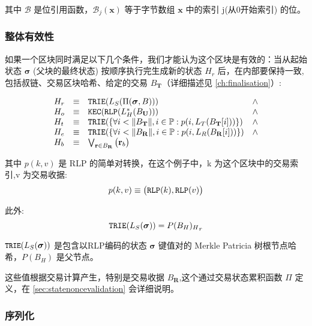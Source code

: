 \documentclass[9pt,oneside]{amsart}
\begin{document}
\begin{multicols}{2}
其中 $\mathcal{B}$ 是位引用函数，$\mathcal{B}_j(\mathbf{x})$ 等于字节数组 $\mathbf{x}$ 中的索引 j(从0开始索引) 的位。

\subsubsection{整体有效性}

如果一个区块同时满足以下几个条件，我们才能认为这个区块是有效的：当从起始状态 $\boldsymbol{\sigma}$ (父块的最终状态) 按顺序执行完生成新的状态 $H_r$ 后，在内部要保持一致,包括叔链、交易区块哈希、给定的交易 $B_\mathbf{T}$（详细描述见 \ref{ch:finalisation}）:

\begin{equation}
\begin{array}[t]{lclc}
H_r &\equiv& \mathtt{\small TRIE}(L_S(\Pi(\boldsymbol{\sigma}, B))) & \wedge \\
H_o &\equiv& \mathtt{\small KEC}(\mathtt{\small RLP}(L_H^*(B_\mathbf{U}))) & \wedge \\
H_t &\equiv& \mathtt{\small TRIE}(\{\forall i < \lVert B_\mathbf{T} \rVert, i \in \mathbb{P}: p(i, L_T(B_\mathbf{T}[i]))\}) & \wedge \\
H_e &\equiv& \mathtt{\small TRIE}(\{\forall i < \lVert B_\mathbf{R} \rVert, i \in \mathbb{P}: p(i, L_R(B_\mathbf{R}[i]))\}) & \wedge \\
H_b &\equiv& \bigvee_{\mathbf{r} \in B_\mathbf{R}} \big( \mathbf{r}_b \big)
\end{array}
\end{equation}

其中 $p(k, v)$ 是 RLP 的简单对转换，在这个例子中，k 为这个区块中的交易索引,v 为交易收据:
\begin{equation}
p(k, v) \equiv \big( \mathtt{\small RLP}(k), \mathtt{\small RLP}(v) \big)
\end{equation}

此外:
\begin{equation}
\mathtt{\small TRIE}(L_S(\boldsymbol{\sigma})) = {P(B_H)_H}_r
\end{equation}

$\texttt{\small TRIE}(L_S(\boldsymbol{\sigma}))$ 是包含以RLP编码的状态 $\boldsymbol{\sigma}$ 键值对的 Merkle Patricia 树根节点哈希，$P(B_H)$ 是父节点。

这些值根据交易计算产生，特别是交易收据 $B_\mathbf{R}$,这个通过交易状态累积函数 $\Pi$ 定义，在 \ref{sec:statenoncevalidation} 会详细说明。

\subsubsection{序列化}


\end{multicols}
\end{document}
